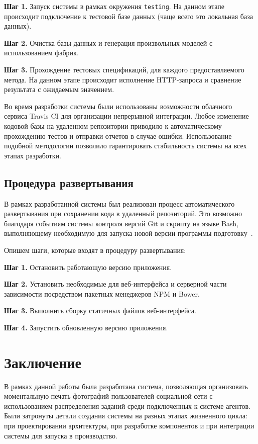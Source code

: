 \documentclass[a4paper,14pt,href,draft]{article}
\begin{document}
\begin{description}
  \item \textbf{Шаг 1.} Запуск системы в рамках окружения \texttt{testing}. На данном этапе происходит подключение к
    тестовой базе данных (чаще всего это локальная база данных).

  \item \textbf{Шаг 2.} Очистка базы данных и генерация произвольных моделей с использованием фабрик.

  \item \textbf{Шаг 3.} Прохождение тестовых спецификаций, для каждого предоставляемого метода. На данном этапе происходит
    исполнение HTTP-запроса и сравнение результата с ожидаемым значением.
\end{description}

Во время разработки системы были использованы возможности облачного сервиса Travis CI для организации непрерывной интеграции.
Любое изменение кодовой базы на удаленном репозитории приводило к автоматическому прохождению тестов и отправки отчетов в
случае ошибки. Использование подобной методологии позволило гарантировать стабильность системы на всех этапах разработки.


\subsection{Процедура развертывания}
В рамках разработанной системы был реализован процесс автоматического развертывания при сохранении кода в удаленный
репозиторий. Это возможно благодаря событиям системы контроля версий Git и скрипту на языке Bash, выполняющему необходимую
для запуска новой версии программы подготовку~\cite{PushDeploy}.

Опишем шаги, которые входят в процедуру развертывания:
\begin{description}
  \item \textbf{Шаг 1.} Остановить работающую версию приложения.
  \item \textbf{Шаг 2.} Установить необходимые для веб-интерфейса и серверной части зависимости посредством пакетных
    менеджеров NPM и Bower.
  \item \textbf{Шаг 3.} Выполнить сборку статичных файлов веб-интерфейса.
  \item \textbf{Шаг 4.} Запустить обновленную версию приложения.
\end{description}

\newpage
\section*{Заключение}
В рамках данной работы была разработана система, позволяющая организовать моментальную печать фотографий пользователей
социальной сети с использованием распределения заданий среди подключенных к системе агентов. Были затронуты детали создания
системы на разных этапах жизненного цикла: при проектировании архитектуры, при разработке компонентов и при интеграции системы
для запуска в производство.
\end{document}
